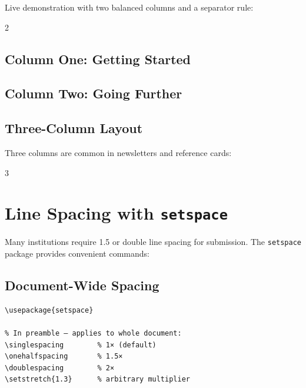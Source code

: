 \documentclass[12pt,a4paper,twoside]{article}
\begin{document}
\medskip
\noindent Live demonstration with two balanced columns and a separator rule:

\setlength{\columnseprule}{0.4pt}   %
\setlength{\columnsep}{20pt}        %
\begin{multicols}{2}

\subsection*{Column One: Getting Started}
\lipsum[3]

\columnbreak

\subsection*{Column Two: Going Further}
\lipsum[4]
\end{multicols}
\setlength{\columnseprule}{0pt}     %

\subsection{Three-Column Layout}

Three columns are common in newsletters and reference cards:

\begin{multicols}{3}
\lipsum[5]
\end{multicols}


\section{Line Spacing with \texttt{setspace}}
\label{sec:setspace}

Many institutions require 1.5\texttimes{} or double line spacing for
submission. The \texttt{setspace} package provides convenient commands:

\subsection{Document-Wide Spacing}

\begin{verbatim}
\usepackage{setspace}

% In preamble — applies to whole document:
\singlespacing        % 1× (default)
\onehalfspacing       % 1.5×
\doublespacing        % 2×
\setstretch{1.3}      % arbitrary multiplier
\end{verbatim}
\end{document}
